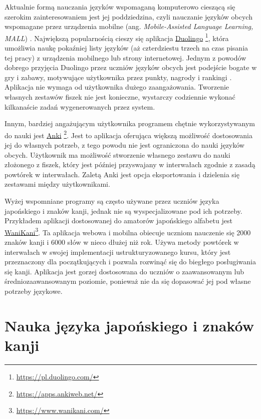 \documentclass[a4paper,twoside,12pt]{book}
\newcommand{\obcy}[1]{\emph{#1}}
\newcommand{\english}[1]{{\selectlanguage{british}\obcy{#1}}}
\begin{document}
Aktualnie formą nauczania języków wspomaganą komputerowo cieszącą się szerokim zainteresowaniem jest jej poddziedzina, czyli nauczanie języków obcych wspomagane przez urządzenia mobilne (ang. \english{Mobile-Assisted Language Learning, MALL}) \cite{bib:artykulDuolingo}. Największą popularnością \cite{bib:internetDuolingo,bib:artykulDuolingo} cieszy się aplikacja \href{https://pl.duolingo.com/}{Duolingo} \footnote{\url{https://pl.duolingo.com/}}, która umożliwia naukę pokaźniej listy języków (aż czterdziestu trzech na czas pisania tej pracy) z urządzenia mobilnego lub strony internetowej. Jednym z powodów dobrego przyjęcia Duolingo przez uczniów języków obcych jest podejście bogate w gry i zabawy, motywujące użytkownika przez punkty, nagrody i rankingi \cite{bib:artykulDuolingo}. Aplikacja nie wymaga od użytkownika dużego zaangażowania. Tworzenie własnych zestawów fiszek nie jest konieczne, wystarczy codziennie wykonać kilkanaście zadań wygenerowanych przez system. 

Innym, bardziej angażującym użytkownika programem chętnie wykorzystywanym do nauki jest \href{https://apps.ankiweb.net/}{Anki} \footnote{\url{https://apps.ankiweb.net/}}. Jest to aplikacja oferująca większą możliwość dostosowania jej do własnych potrzeb, z tego powodu nie jest ograniczona do nauki języków obcych. Użytkownik ma możliwość stworzenie własnego zestawu do nauki złożonego z fiszek, który jest później przyswajany w interwałach zgodnie z zasadą powtórek w interwałach. Zaletą Anki jest opcja eksportowania i dzielenia się zestawami między użytkownikami. 

Wyżej wspomniane programy są często używane przez uczniów języka japońskiego i znaków kanji, jednak nie są wyspecjalizowane pod ich potrzeby. Przykładem aplikacji dostosowanej do amatorów japońskiego alfabetu jest \href{https://www.wanikani.com/}{WaniKani}\footnote{\url{https://www.wanikani.com/}}. Ta aplikacja webowa i mobilna obiecuje uczniom nauczenie się 2000 znaków kanji i 6000 słów w nieco dłużej niż rok. Używa metody powtórek w interwałach w swojej implementacji ustrukturyzowanego kursu, który jest przeznaczony dla początkujących i pozwala rozwinąć się do biegłego posługiwania się kanji. Aplikacja jest gorzej dostosowana do uczniów o zaawansowanym lub średniozaawansowanym poziomie, ponieważ nie da się dopasować jej pod własne potrzeby językowe. 

\section{Nauka języka japońskiego i znaków kanji}
\end{document}
